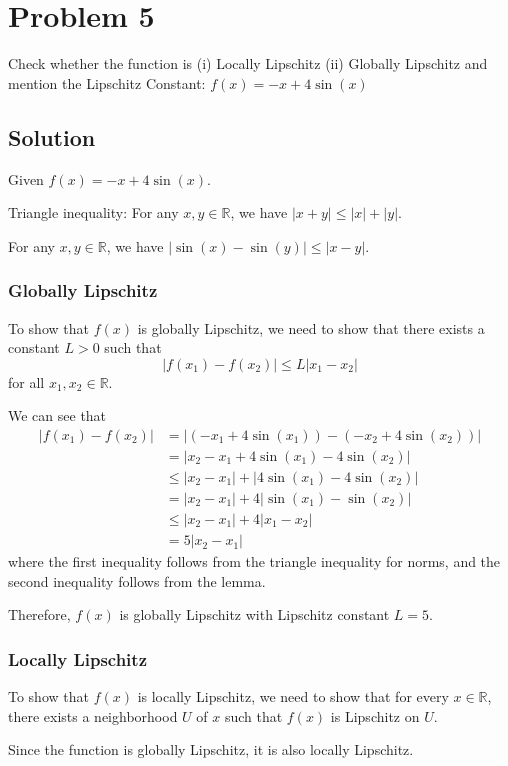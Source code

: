 \section*{Problem 5}

Check whether the function is
(i) Locally Lipschitz
(ii) Globally Lipschitz
and mention the Lipschitz Constant:
\( f (x) = -x + 4\sin(x) \)

\subsection*{Solution}

Given \( f(x) = -x + 4\sin(x) \).

\begin{lemma}{Triangle inequality:}
    For any \( x, y \in \mathbb{R} \), we have \( \lvert x + y \rvert \leq \lvert x \rvert + \lvert y \rvert \).
\end{lemma}

\begin{lemma}
    For any \( x, y \in \mathbb{R} \), we have \( \lvert \sin(x) - \sin(y) \rvert \leq \lvert x - y \rvert \).
\end{lemma}

\subsubsection*{Globally Lipschitz}

To show that \( f(x) \) is globally Lipschitz, we need to show that there exists a constant \( L > 0 \) such that
\[
    \lvert f(x_1) - f(x_2) \rvert \leq L \lvert x_1 - x_2 \rvert
\]
for all \( x_1, x_2 \in \mathbb{R} \).

We can see that
\begin{align*}
    \lvert f(x_1) - f(x_2) \rvert
     & =
    \lvert (-x_1 + 4\sin(x_1)) - (-x_2 + 4\sin(x_2)) \rvert
    \\ & =
    \lvert x_2 - x_1 + 4\sin(x_1) - 4\sin(x_2) \rvert
    \\ & \leq
    \lvert x_2 - x_1 \rvert + \lvert 4\sin(x_1) - 4\sin(x_2) \rvert
    \\ & =
    \lvert x_2 - x_1 \rvert + 4 \lvert \sin(x_1) - \sin(x_2) \rvert
    \\ & \leq
    \lvert x_2 - x_1 \rvert + 4 \lvert x_1 - x_2 \rvert
    \\ & = 5 \lvert x_2 - x_1 \rvert
\end{align*}
where the first inequality follows from the triangle inequality for norms, and the second inequality follows from the lemma.

Therefore, \( f(x) \) is globally Lipschitz with Lipschitz constant \( L = 5 \).

\subsubsection*{Locally Lipschitz}

To show that \( f(x) \) is locally Lipschitz, we need to show that for every \( x \in \mathbb{R} \), there exists a neighborhood \( U \) of \( x \) such that \( f(x) \) is Lipschitz on \( U \).

Since the function is globally Lipschitz, it is also locally Lipschitz.
